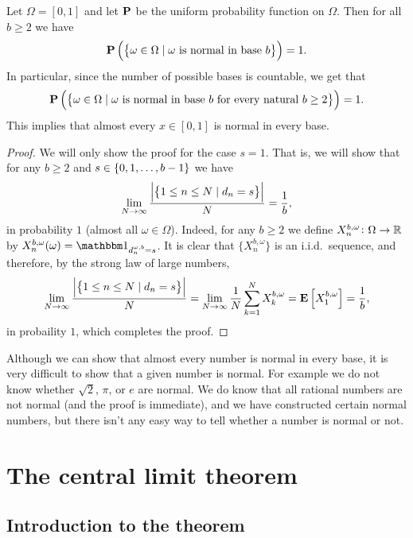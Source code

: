 \documentclass[11pt,a4paper]{article}
\begin{document}
\begin{proposition}
  Let $\Omega = [0,1]$ and let $\mathbf{P}$ be the uniform probability function
  on $\Omega$.
  Then for all $b \geq 2$ we have
  \[
    \Prob\del{\set{\omega \in \Omega \mid \text{$\omega$ is normal in base $b$}}} = 1.
  \]
  In particular, since the number of possible bases is countable,
  we get that
  \[
    \Prob\del{\set{\omega \in \Omega \mid \text{$\omega$ is normal in base $b$ for every natural $b \geq 2$}}} = 1.
  \]
  This implies that almost every $x \in [0,1]$ is normal in every
  base.
\end{proposition}
\begin{proof}
  We will only show the proof for the case $s = 1$.
  That is, we will show that for any $b \geq 2$ and $s \in \left\{0,1,\dots,b-1\right\}$
  we have
  \[
    \lim_{N \to \infty}
    \frac{\left\lvert\left\{1 \leq n \leq N \mid d_{n} = s\right\}\right\rvert}{N}
    = \frac{1}{b} ,
  \]
  in probability $1$ (almost all $\omega \in \Omega$).
  Indeed, for any $b \geq 2$ we define $X^{b,\omega}_n \colon \Omega \to \mathbb{R}$
  by $X^{b,\omega}_n(\omega) = \ind_{d^{\omega,b}_n = s}$.
  It is clear that $\{X^{b,\omega}_n\}$ is an i.i.d.\ sequence,
  and therefore, by the strong law of large numbers,
  \[
    \lim_{N \to \infty}
    \frac{\left\lvert\left\{1 \leq n \leq N \mid d_{n} = s\right\}\right\rvert}{N} =
    \lim_{N \to \infty} \frac{1}{N} \sum_{k=1}^{N} X^{b,\omega}_k =
    \mathbf{E}\left[X^{b,\omega}_1\right] = \frac{1}{b},
  \]
  in probaility $1$, which completes the proof.
\end{proof}

\begin{remark}
  Although we can show that almost every number is normal in every base,
  it is very difficult to show that a given number is normal.
  For example we do not know whether $\sqrt{2}$, $\pi$, or $e$ are normal.
  We do know that all rational numbers are not normal (and the proof
  is immediate), and we have constructed certain normal numbers,
  but there isn't any easy way to tell whether a number is normal or not.
\end{remark}

\newpage

\section{The central limit theorem}
\subsection{Introduction to the theorem}
\end{document}
